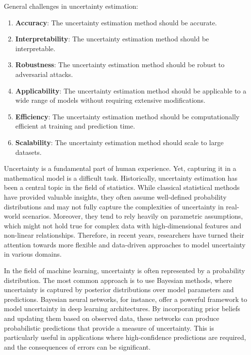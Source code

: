 \iffalse

General challenges in uncertainty estimation:
\begin{enumerate}
    \item \textbf{Accuracy}: The uncertainty estimation method should be accurate.
    \item \textbf{Interpretability}: The uncertainty estimation method should be interpretable.
    \item \textbf{Robustness}: The uncertainty estimation method should be robust to adversarial attacks.
    \item \textbf{Applicability}: The uncertainty estimation method should be applicable to a wide range of models without requiring extensive modifications.
    \item \textbf{Efficiency}: The uncertainty estimation method should be computationally efficient at training and prediction time.
    \item \textbf{Scalability}: The uncertainty estimation method should scale to large datasets.
\end{enumerate}







Uncertainty is a fundamental part of human experience. Yet, capturing it in a mathematical model is a difficult task. Historically, uncertainty estimation has been a central topic in the field of statistics. While classical statistical methods have provided valuable insights, they often assume well-defined probability distributions and may not fully capture the complexities of uncertainty in real-world scenarios. Moreover, they tend to rely heavily on parametric assumptions, which might not hold true for complex data with high-dimensional features and non-linear relationships. Therefore, in recent years, researchers have turned their attention towards more flexible and data-driven approaches to model uncertainty in various domains.

In the field of machine learning, uncertainty is often represented by a probability distribution. The most common approach is to use Bayesian methods, where uncertainty is captured by posterior distributions over model parameters and predictions. Bayesian neural networks, for instance, offer a powerful framework to model uncertainty in deep learning architectures. By incorporating prior beliefs and updating them based on observed data, these networks can produce probabilistic predictions that provide a measure of uncertainty. This is particularly useful in applications where high-confidence predictions are required, and the consequences of errors can be significant.

